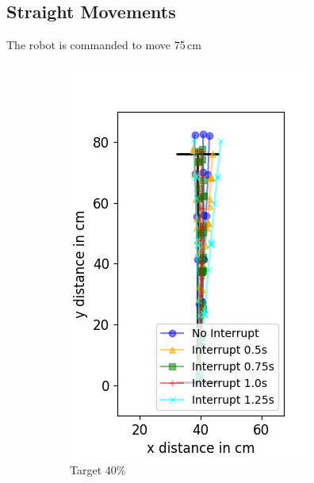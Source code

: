 \subsection{Straight Movements}

The robot is commanded to move 75\,cm

\begin{figure}
	\centering
	\begin{subfigure}[b]{0.32\textwidth}
		\includegraphics[width=\textwidth]{pics/straight_40.png}
		\caption{Target 40\%}
		\label{fig:stra_exp1}
	\end{subfigure}
	\begin{subfigure}[b]{0.32\textwidth}

\end{subfigure}
\end{figure}
